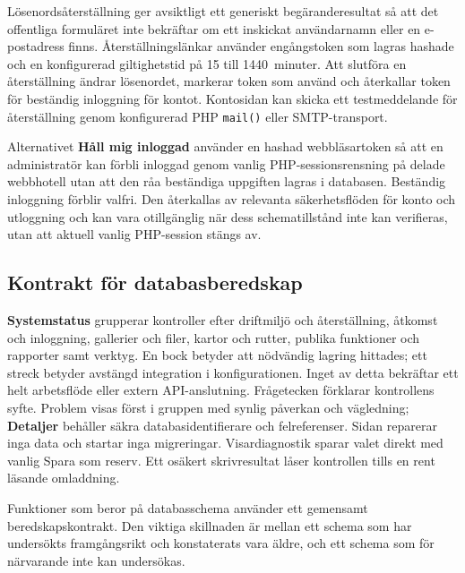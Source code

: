 \documentclass[11pt,a4paper]{article}
\newcommand{\ui}[1]{\textbf{#1}}
\newcommand{\codeword}[1]{\nolinkurl{#1}}
\begin{document}
Lösenordsåterställning ger avsiktligt ett generiskt begäranderesultat så att det
offentliga formuläret inte bekräftar om ett inskickat användarnamn eller en
e-postadress finns. Återställningslänkar använder engångstoken som lagras
hashade och en konfigurerad giltighetstid på 15 till 1440~minuter. Att slutföra
en återställning ändrar lösenordet, markerar token som använd och återkallar
token för beständig inloggning för kontot. Kontosidan kan skicka ett
testmeddelande för återställning genom konfigurerad PHP \codeword{mail()} eller
SMTP-transport.

Alternativet \ui{Håll mig inloggad} använder en hashad webbläsartoken så att en
administratör kan förbli inloggad genom vanlig PHP-sessionsrensning på delade
webbhotell utan att den råa beständiga uppgiften lagras i databasen. Beständig
inloggning förblir valfri. Den återkallas av relevanta säkerhetsflöden för konto
och utloggning och kan vara otillgänglig när dess schematillstånd inte kan
verifieras, utan att aktuell vanlig PHP-session stängs av.
\subsection{Kontrakt för databasberedskap}
\label{sec:db-readiness-contract}

\ui{Systemstatus} grupperar kontroller efter driftmiljö och återställning,
åtkomst och inloggning, gallerier och filer, kartor och rutter, publika
funktioner
och rapporter samt verktyg. En bock betyder att nödvändig lagring hittades;
ett streck betyder avstängd integration i konfigurationen. Inget av detta
bekräftar ett helt arbetsflöde eller extern API-anslutning. Frågetecken
förklarar
kontrollens syfte. Problem visas först i gruppen med synlig påverkan och
vägledning; \ui{Detaljer} behåller säkra databasidentifierare och felreferenser.
Sidan reparerar inga data och startar inga migreringar. Visardiagnostik sparar
valet direkt med vanlig Spara som reserv. Ett osäkert skrivresultat låser
kontrollen tills en rent läsande omladdning.

Funktioner som beror på databasschema använder ett gemensamt beredskapskontrakt.
Den viktiga skillnaden är mellan ett schema som har undersökts framgångsrikt och
konstaterats vara äldre, och ett schema som för närvarande inte kan undersökas.
\end{document}
